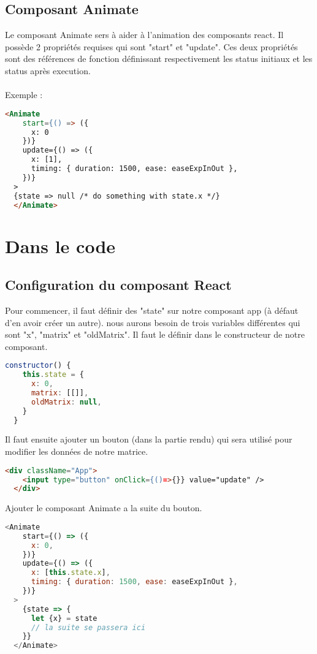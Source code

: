\documentclass[a4paper, french, 12pt]{extarticle}
\begin{document}
\subsection{Composant Animate}
Le composant Animate sers à aider à l'animation des composants react. Il possède 2 propriétés requises qui sont "start" et "update". Ces deux propriétés sont des références de fonction définissant respectivement les status initiaux et les status après execution.\\\\
Exemple :
\begin{lstlisting}[language=html]
  <Animate
    start={() => ({
      x: 0
    })}
    update={() => ({
      x: [1],
      timing: { duration: 1500, ease: easeExpInOut },
    })}
  >
  {state => null /* do something with state.x */}
  </Animate>
\end{lstlisting}

\section{Dans le code}
\subsection{Configuration du composant React}
Pour commencer, il faut définir des "state" sur notre composant app (à défaut d'en avoir créer un autre). nous aurons besoin de trois variables différentes qui sont "x", "matrix" et "oldMatrix". Il faut le définir dans le constructeur de notre composant.
\begin{lstlisting}[language=JavaScript]
  constructor() {
    this.state = {
      x: 0,
      matrix: [[]],
      oldMatrix: null,
    }
  }
\end{lstlisting}
Il faut ensuite ajouter un bouton (dans la partie rendu) qui sera utilisé pour modifier les données de notre matrice.
\begin{lstlisting}[language=html]
  <div className="App">
    <input type="button" onClick={()=>{}} value="update" />
  </div>
\end{lstlisting}
Ajouter le composant Animate a la suite du bouton.
\begin{lstlisting}[language=JavaScript]
  <Animate
    start={() => ({
      x: 0,
    })}
    update={() => ({
      x: [this.state.x],
      timing: { duration: 1500, ease: easeExpInOut },
    })}
  >
    {state => {
      let {x} = state
      // la suite se passera ici
    }}
  </Animate>
\end{lstlisting}
\end{document}
